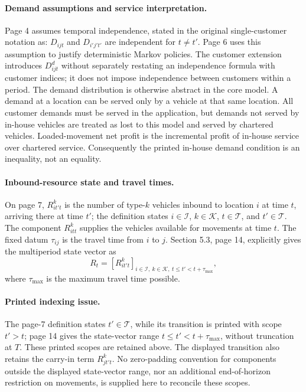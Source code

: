 \documentclass{article}
\begin{document}
\paragraph{Demand assumptions and service interpretation.}
Page 4 assumes temporal independence, stated in the original single-customer notation as: \(D_{ijt}\) and \(D_{i'j't'}\) are independent for \(t\ne t'\). Page 6 uses this assumption to justify deterministic Markov policies. The customer extension introduces \(D_{ijt}^{d}\) without separately restating an independence formula with customer indices; it does not impose independence between customers within a period. The demand distribution is otherwise abstract in the core model. A demand at a location can be served only by a vehicle at that same location. All customer demands must be served in the application, but demands not served by in-house vehicles are treated as lost to this model and served by chartered vehicles. Loaded-movement net profit is the incremental profit of in-house service over chartered service. Consequently the printed in-house demand condition is an inequality, not an equality.

\paragraph{Inbound-resource state and travel times.}
On page 7, \(R_{it't}^{k}\) is the number of type-\(k\) vehicles inbound to location \(i\) at time \(t\), arriving there at time \(t'\); the definition states \(i\in\mathcal{I}\), \(k\in\mathcal{K}\), \(t\in\mathcal{T}\), and \(t'\in\mathcal{T}\). The component \(R_{itt}^{k}\) supplies the vehicles available for movements at time \(t\). The fixed datum \(\tau_{ij}\) is the travel time from \(i\) to \(j\). Section 5.3, page 14, explicitly gives the multiperiod state vector as
\[
R_t=[R_{it't}^{k}]_{i\in\mathcal{I},\ k\in\mathcal{K},\ t\leq t'<t+\tau_{\max}},
\]
where \(\tau_{\max}\) is the maximum travel time possible.

\paragraph{Printed indexing issue.}
The page-7 definition states \(t'\in\mathcal{T}\), while its transition is printed with scope \(t'>t\); page 14 gives the state-vector range \(t\leq t'<t+\tau_{\max}\), without truncation at \(T\). These printed scopes are retained above. The displayed transition also retains the carry-in term \(R_{jt't}^{k}\). No zero-padding convention for components outside the displayed state-vector range, nor an additional end-of-horizon restriction on movements, is supplied here to reconcile these scopes.
\end{document}
